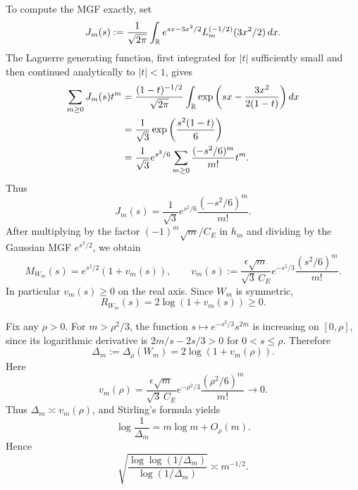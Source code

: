 To compute the MGF exactly, set
\[
J_m(s):=\frac1{\sqrt{2\pi}}
\int_{\mathbb R}e^{sx-3x^2/2}L_m^{(-1/2)}(3x^2/2)\,dx.
\]
The Laguerre generating function, first integrated for $|t|$ sufficiently small and then continued analytically to $|t|<1$, gives
\begin{align*}
\sum_{m\ge0}J_m(s)t^m
&=\frac{(1-t)^{-1/2}}{\sqrt{2\pi}}
\int_{\mathbb R}
\exp\left(sx-\frac{3x^2}{2(1-t)}\right)dx\\
&=\frac1{\sqrt3}\exp\left(\frac{s^2(1-t)}6\right)\\
&=\frac1{\sqrt3}e^{s^2/6}
\sum_{m\ge0}\frac{(-s^2/6)^m}{m!}t^m.
\end{align*}
Thus
\[
J_m(s)=\frac1{\sqrt3}e^{s^2/6}\frac{(-s^2/6)^m}{m!}.
\]
After multiplying by the factor $(-1)^m\sqrt m/C_E$ in $h_m$ and dividing by the Gaussian MGF $e^{s^2/2}$, we obtain
\begin{equation}\label{eq:even-laguerre-mgf}
M_{W_m}(s)=e^{s^2/2}(1+v_m(s)),
\qquad
v_m(s):=
\frac{\epsilon\sqrt m}{\sqrt3\,C_E}
 e^{-s^2/3}\frac{(s^2/6)^m}{m!}.
\end{equation}
In particular $v_m(s)\ge0$ on the real axis. Since $W_m$ is symmetric,
\begin{equation}\label{eq:even-laguerre-defect}
R_{W_m}(s)=2\log(1+v_m(s))\ge0.
\end{equation}

Fix any $\rho>0$. For $m>\rho^2/3$, the function $s\mapsto e^{-s^2/3}s^{2m}$ is increasing on $[0,\rho]$, since its logarithmic derivative is $2m/s-2s/3>0$ for $0<s\le\rho$. Therefore
\[
\Delta_m:=\Delta_\rho(W_m)
=2\log(1+v_m(\rho)).
\]
Here
\[
v_m(\rho)=\frac{\epsilon\sqrt m}{\sqrt3\,C_E}
 e^{-\rho^2/3}\frac{(\rho^2/6)^m}{m!}\longrightarrow0.
\]
Thus $\Delta_m\asymp v_m(\rho)$, and Stirling's formula yields
\begin{equation}\label{eq:even-laguerre-delta}
\log\frac1{\Delta_m}=m\log m+O_\rho(m).
\end{equation}
Hence
\[
\sqrt{\frac{\log\log(1/\Delta_m)}{\log(1/\Delta_m)}}
\asymp m^{-1/2}.
\]

